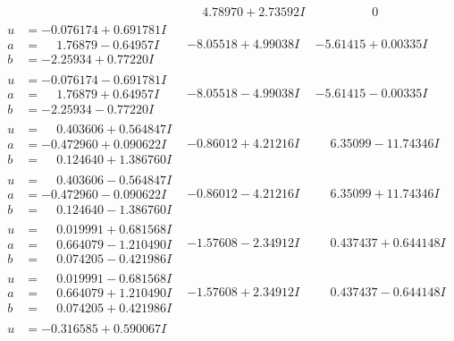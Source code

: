 \documentclass[1p]{elsarticle_modified}
\theoremstyle{definition}
\begin{document}
$$\begin{array}{c|c|c}
 & \phantom{-}4.78970 + 2.73592 I & \phantom{-0.000000 } 0 \\ \hline\begin{aligned}
u &= -0.076174 + 0.691781 I \\
a &= \phantom{-}1.76879 - 0.64957 I \\
b &= -2.25934 + 0.77220 I\end{aligned}
 & -8.05518 + 4.99038 I & -5.61415 + 0.00335 I \\ \hline\begin{aligned}
u &= -0.076174 - 0.691781 I \\
a &= \phantom{-}1.76879 + 0.64957 I \\
b &= -2.25934 - 0.77220 I\end{aligned}
 & -8.05518 - 4.99038 I & -5.61415 - 0.00335 I \\ \hline\begin{aligned}
u &= \phantom{-}0.403606 + 0.564847 I \\
a &= -0.472960 + 0.090622 I \\
b &= \phantom{-}0.124640 + 1.386760 I\end{aligned}
 & -0.86012 + 4.21216 I & \phantom{-}6.35099 - 11.74346 I \\ \hline\begin{aligned}
u &= \phantom{-}0.403606 - 0.564847 I \\
a &= -0.472960 - 0.090622 I \\
b &= \phantom{-}0.124640 - 1.386760 I\end{aligned}
 & -0.86012 - 4.21216 I & \phantom{-}6.35099 + 11.74346 I \\ \hline\begin{aligned}
u &= \phantom{-}0.019991 + 0.681568 I \\
a &= \phantom{-}0.664079 - 1.210490 I \\
b &= \phantom{-}0.074205 - 0.421986 I\end{aligned}
 & -1.57608 - 2.34912 I & \phantom{-}0.437437 + 0.644148 I \\ \hline\begin{aligned}
u &= \phantom{-}0.019991 - 0.681568 I \\
a &= \phantom{-}0.664079 + 1.210490 I \\
b &= \phantom{-}0.074205 + 0.421986 I\end{aligned}
 & -1.57608 + 2.34912 I & \phantom{-}0.437437 - 0.644148 I \\ \hline\begin{aligned}
u &= -0.316585 + 0.590067 I \\

\end{aligned}
\end{array}$$
\end{document}
